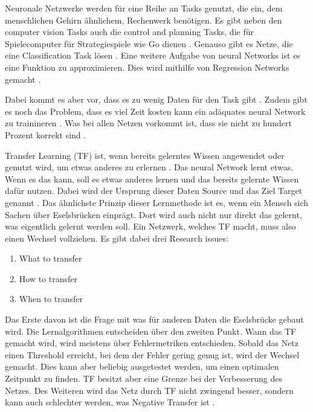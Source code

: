 Neuronale Netzwerke werden für eine Reihe an Tasks genutzt, die ein, dem menschlichen Gehirn ähnlichem, Rechenwerk benötigen. 
Es gibt neben den computer vision Tasks auch die control and planning Tasks, die für Spielecomputer für Strategiespiele wie Go dienen \cite{deep_neural_networks_scientific_models}.
Genauso gibt es Netze, die eine Classification Task lösen \cite{handwritten_digit}. 
Eine weitere Aufgabe von neural Networks ist es eine Funktion zu approximieren. Dies 
wird mithilfe von Regression Networks gemacht \cite{Gen_Reg}.      

Dabei kommt es aber vor, dass es zu wenig Daten für den Task gibt \cite{survey_transfer}. 
Zudem gibt es noch das Problem, dass es viel Zeit kosten kann ein adäquates 
neural Network zu trainineren \cite{cascor}. 
Was bei allen Netzen vorkommt ist, dass sie nicht zu hundert Prozent korrekt sind \cite{EvoClassAndReg}.

Transfer Learning (TF) ist, wenn bereits gelerntes Wissen angewendet oder genutzt wird, um etwas anderes zu erlernen \cite{transfer_learning}. 
Das neural Network lernt etwas. Wenn es das kann, soll es etwas anderes lernen und das bereits gelernte Wissen dafür nutzen. 
Dabei wird der Ursprung dieser Daten Source und das Ziel Target genannt \cite{phd_deep_cascade}. 
Das ähnlichste Prinzip dieser Lernmethode ist es, wenn ein Mensch sich Sachen über Eselsbrücken 
einprägt. Dort wird auch nicht nur direkt das gelernt, was eigentlich gelernt werden soll. 
Ein Netzwerk, welches TF macht, muss also einen Wechsel vollziehen. 
Es gibt dabei drei Research issues: 
\begin{enumerate}
    \item What to transfer
    \item How to transfer
    \item When to transfer
\end{enumerate}
\cite{survey_transfer}
Das Erste davon ist die Frage mit was für anderen Daten die Eselsbrücke gebaut wird. 
Die Lernalgorithmen entscheiden über den zweiten Punkt. Wann das TF 
gemacht wird, wird meistens über Fehlermetriken entschieden. Sobald das Netz einen Threshold erreicht, 
bei dem der Fehler gering genug ist, wird der Wechsel gemacht. Dies kann aber beliebig 
ausgetestet werden, um einen optimalen Zeitpunkt zu finden. 
TF besitzt aber eine Grenze bei der Verbesserung des Netzes. Des Weiteren wird das Netz durch TF nicht zwingend besser, 
sondern kann auch schlechter werden, was Negative Transfer ist \cite{survey_transfer}. 

